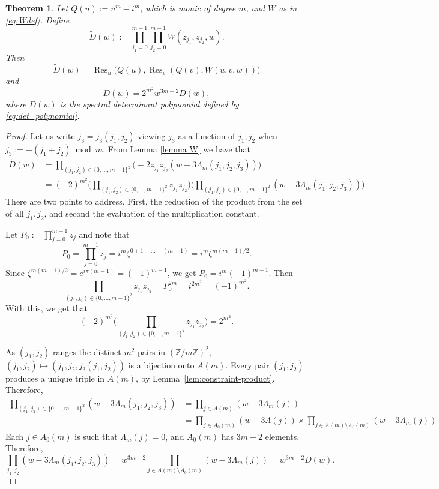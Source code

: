 \documentclass[11pt,reqno]{amsart}
\newtheorem{theorem}{Theorem}[section]
\theoremstyle{remark}
\DeclareMathOperator{\Res}{Res}
\begin{document}
\begin{theorem}
\label{thm:second-resultant}
Let $Q(u):=u^m-i^m$, which is monic of degree $m$, and $W$ as in \eqref{eq:Wdef}.
Define
\begin{equation}\label{eq:resultant_product}
\widetilde D(w) := \prod_{j_1=0}^{m-1}\prod_{j_2=0}^{m-1}W(z_{j_1},z_{j_2},w).
\end{equation}
Then
$$
\widetilde D(w) =
\Res_u\big(Q(u),\Res_v(Q(v),W(u,v,w))\big)
$$
and
\[
\widetilde D(w) = 2^{m^2}w^{3m-2}D(w),
\]
where $D(w)$ is the spectral determinant polynomial defined by \eqref{eq:det_polynomial}.
\end{theorem}

\begin{proof}
Let us write $j_3=j_3(j_1,j_2)$ viewing $j_{3}$ as a function of $j_{1}, j_{2}$ when $j_{3}:=-(j_1+j_2)\bmod m$. From Lemma \ref{lemma W} we have that
\begin{align*}
\widetilde D(w) &= \prod_{(j_1,j_2)\in\{0,...,m-1\}^2}\Big({-}2z_{j_1}z_{j_2}(w-3\Lambda_{m}(j_1,j_2,j_3))\Big)
\\&= (-2)^{m^2}\Big(\prod_{(j_1,j_2)\in\{0,...,m-1\}^2}z_{j_1}z_{j_2}\Big)\Big(\prod_{(j_1,j_2)\in\{0,...,m-1\}^2}(w-3\Lambda_{m}(j_1,j_2,j_3))\Big).
\end{align*}
There are two points to address.  First, the reduction of the product from the set of all $j_{1}, j_{2}$, and second
the evaluation of the multiplication constant.

Let $P_0:=\prod_{j=0}^{m-1}z_j$ and note that
$$
P_{0}=\prod_{j=0}^{m-1}z_j = i^m\zeta^{0+1+\dots+(m-1)}=i^m\zeta^{m(m-1)/2}.
$$
Since $\zeta^{m(m-1)/2}=e^{i\pi(m-1)}=(-1)^{m-1}$, we get
$P_0=i^m(-1)^{m-1}$. Then
$$
\prod_{(j_1,j_2)\in\{0,...,m-1\}^2}z_{j_1}z_{j_2}=P_0^{2m}=i^{2m^2}=(-1)^{m^2}.
$$
With this, we get that
$$
(-2)^{m^2}\Big(\prod_{(j_1,j_2)\in\{0,...,m-1\}^2}z_{j_1}z_{j_2}\Big)=2^{m^{2}}.
$$

As $(j_1,j_2)$ ranges the distinct $m^2$
pairs in $(\mathbb Z/m\mathbb Z)^2$,
$(j_1,j_2)\mapsto(j_1,j_2,j_3(j_1,j_2))$ is a bijection onto $A(m)$. Every pair $(j_1,j_2)$
produces a unique triple in $A(m)$, by
Lemma~\ref{lem:constraint-product}.  Therefore,
\begin{align*}
\prod_{(j_1,j_2)\in\{0,...,m-1\}^2}(w-3\Lambda_{m}(j_1,j_2,j_3)) &=
\prod_{j\in A(m)}(w-3\Lambda_{m}(j)) \\&=
\prod_{j\in A_0(m)} (w-3 \Lambda(j))\times
\prod_{j\in A(m)\setminus A_0(m)}(w-3\Lambda_{m}(j))
\end{align*}
Each $j \in A_0(m)$ is such that $\Lambda_{m}(j)=0$,
and $A_0(m)$ has $3m-2$ elements.
Therefore,
$$
\prod_{j_1,j_2}(w-3\Lambda_{m}(j_1,j_2,j_3))
= w^{3m-2}\prod_{j\in A(m)\setminus A_0(m)}(w-3\Lambda_{m}(j))
= w^{3m-2}D(w).
$$
\end{proof}
\end{document}

